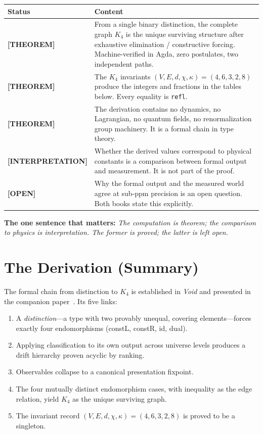 \documentclass[11pt,a4paper]{article}
\newcommand{\THEOREM}{\textcolor{blue!70!black}{\textbf{[THEOREM]}}}
\newcommand{\INTERP}{\textcolor{orange!80!black}{\textbf{[INTERPRETATION]}}}
\newcommand{\OPEN}{\textcolor{red!70!black}{\textbf{[OPEN]}}}
\theoremstyle{definition}
\begin{document}
\begin{center}
\renewcommand{\arraystretch}{1.4}
\begin{tabular}{@{}lp{9cm}@{}}
\toprule
\textbf{Status} & \textbf{Content} \\
\midrule
\THEOREM & From a single binary distinction, the complete graph $K_4$ is the
  unique surviving structure after exhaustive elimination / constructive
  forcing.  Machine-verified in Agda, zero postulates, two independent paths. \\
\THEOREM & The $K_4$ invariants $(V,E,d,\chi,\kappa) = (4,6,3,2,8)$ produce
  the integers and fractions in the tables below.  Every equality is
  \texttt{refl}. \\
\THEOREM & The derivation contains no dynamics, no Lagrangian, no quantum
  fields, no renormalization group machinery.  It is a formal chain in type
  theory. \\
\INTERP & Whether the derived values correspond to physical constants is a
  comparison between formal output and measurement.  It is not part of the
  proof. \\
\OPEN & Why the formal output and the measured world agree at sub-ppm
  precision is an open question.  Both books state this explicitly. \\
\bottomrule
\end{tabular}
\end{center}

\noindent\textbf{The one sentence that matters:}
\emph{The computation is theorem; the comparison to physics is interpretation.
The former is proved; the latter is left open.}

\section{The Derivation (Summary)}
\label{sec:derivation}

The formal chain from distinction to $K_4$ is established in
\textit{Void} and presented in the companion
paper~\cite{wielsch2026companion}.  Its five links:

\begin{enumerate}[nosep]
  \item A \emph{distinction}---a type with two provably unequal, covering
    elements---forces exactly four endomorphisms (constL, constR, id, dual).
  \item Applying classification to its own output across universe levels
    produces a drift hierarchy proven acyclic by ranking.
  \item Observables collapse to a canonical presentation fixpoint.
  \item The four mutually distinct endomorphism cases, with inequality as
    the edge relation, yield $K_4$ as the unique surviving graph.
  \item The invariant record $(V,E,d,\chi,\kappa) = (4,6,3,2,8)$ is proved
    to be a singleton.
\end{enumerate}
\end{document}
